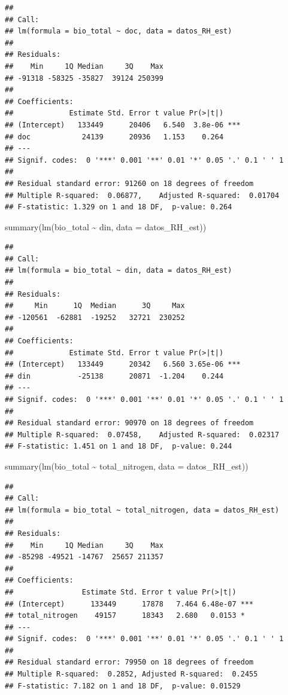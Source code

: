 \documentclass[
]{book}
\newenvironment{Shaded}{\begin{snugshade}}{\end{snugshade}}
\newcommand{\AttributeTok}[1]{\textcolor[rgb]{0.77,0.63,0.00}{#1}}
\newcommand{\FunctionTok}[1]{\textcolor[rgb]{0.00,0.00,0.00}{#1}}
\newcommand{\NormalTok}[1]{#1}
\newcommand{\SpecialCharTok}[1]{\textcolor[rgb]{0.00,0.00,0.00}{#1}}
\begin{document}
\begin{verbatim}
## 
## Call:
## lm(formula = bio_total ~ doc, data = datos_RH_est)
## 
## Residuals:
##    Min     1Q Median     3Q    Max 
## -91318 -58325 -35827  39124 250399 
## 
## Coefficients:
##             Estimate Std. Error t value Pr(>|t|)    
## (Intercept)   133449      20406   6.540  3.8e-06 ***
## doc            24139      20936   1.153    0.264    
## ---
## Signif. codes:  0 '***' 0.001 '**' 0.01 '*' 0.05 '.' 0.1 ' ' 1
## 
## Residual standard error: 91260 on 18 degrees of freedom
## Multiple R-squared:  0.06877,    Adjusted R-squared:  0.01704 
## F-statistic: 1.329 on 1 and 18 DF,  p-value: 0.264
\end{verbatim}

\begin{Shaded}
\begin{Highlighting}[]
\FunctionTok{summary}\NormalTok{(}\FunctionTok{lm}\NormalTok{(bio\_total }\SpecialCharTok{\textasciitilde{}}\NormalTok{ din, }\AttributeTok{data =}\NormalTok{ datos\_RH\_est))}
\end{Highlighting}
\end{Shaded}

\begin{verbatim}
## 
## Call:
## lm(formula = bio_total ~ din, data = datos_RH_est)
## 
## Residuals:
##     Min      1Q  Median      3Q     Max 
## -120561  -62881  -19252   32721  230252 
## 
## Coefficients:
##             Estimate Std. Error t value Pr(>|t|)    
## (Intercept)   133449      20342   6.560 3.65e-06 ***
## din           -25138      20871  -1.204    0.244    
## ---
## Signif. codes:  0 '***' 0.001 '**' 0.01 '*' 0.05 '.' 0.1 ' ' 1
## 
## Residual standard error: 90970 on 18 degrees of freedom
## Multiple R-squared:  0.07458,    Adjusted R-squared:  0.02317 
## F-statistic: 1.451 on 1 and 18 DF,  p-value: 0.244
\end{verbatim}

\begin{Shaded}
\begin{Highlighting}[]
\FunctionTok{summary}\NormalTok{(}\FunctionTok{lm}\NormalTok{(bio\_total }\SpecialCharTok{\textasciitilde{}}\NormalTok{ total\_nitrogen, }\AttributeTok{data =}\NormalTok{ datos\_RH\_est))}
\end{Highlighting}
\end{Shaded}

\begin{verbatim}
## 
## Call:
## lm(formula = bio_total ~ total_nitrogen, data = datos_RH_est)
## 
## Residuals:
##    Min     1Q Median     3Q    Max 
## -85298 -49521 -14767  25657 211357 
## 
## Coefficients:
##                Estimate Std. Error t value Pr(>|t|)    
## (Intercept)      133449      17878   7.464 6.48e-07 ***
## total_nitrogen    49157      18343   2.680   0.0153 *  
## ---
## Signif. codes:  0 '***' 0.001 '**' 0.01 '*' 0.05 '.' 0.1 ' ' 1
## 
## Residual standard error: 79950 on 18 degrees of freedom
## Multiple R-squared:  0.2852, Adjusted R-squared:  0.2455 
## F-statistic: 7.182 on 1 and 18 DF,  p-value: 0.01529
\end{verbatim}
\end{document}
